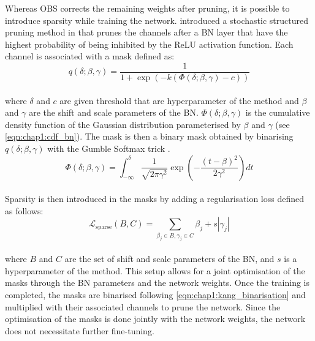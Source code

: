 Whereas \ac{OBS} corrects the remaining weights after pruning, it is possible to
introduce sparsity while training the network.
\citeauthor{DBLP:conf/icml/KangH20} introduced a stochastic structured pruning
method in \cite{DBLP:conf/icml/KangH20} that prunes the channels after a \ac{BN}
layer that have the highest probability of being inhibited by the \ac{ReLU}
activation function. Each channel is associated with a mask defined as:\\

\begin{equation}
  q(\delta;\beta,\gamma) = \frac{1}{1 +\exp ( - k (\Phi(\delta;\beta,\gamma)-c))}
\end{equation}\\

\noindent where $\delta$ and $c$ are given threshold that are hyperparameter of
the method and $\beta$ and $\gamma$ are the shift and scale parameters of the
\ac{BN}. $\Phi(\delta;\beta,\gamma)$ is the cumulative density function of the
Gaussian distribution parameterised by $\beta$ and $\gamma$ (see \cref{eqn:chap1:cdf_bn}). The mask is then a
binary mask obtained by binarising $q(\delta;\beta,\gamma)$ with the Gumble
Softmax trick \cite{DBLP:conf/iclr/JangGP17}.\\

\begin{equation}
  \label{eqn:chap1:cdf_bn}
  \Phi(\delta;\beta,\gamma) = \int_{-\infty}^{\delta} \frac{1}{\sqrt{2\pi\gamma^2}} \exp( - \frac{(t-\beta)^2}{2\gamma^2} ) dt 
\end{equation}\\

\noindent Sparsity is then introduced in the masks by adding a regularisation
loss defined as follows:\\ 

\begin{equation}
 \mathcal{L}_{\text{{sparse}}}(B, C) = \sum_{\beta_j \in B, \gamma_j \in C} \beta_j + s|\gamma_j|
\end{equation}\\

\noindent where $B$ and $C$ are the set of shift and scale parameters of the
\ac{BN}, and $s$ is a hyperparameter of the method. This setup allows for a
joint optimisation of the masks through the \ac{BN} parameters and the network
weights. Once the training is completed, the masks are binarised following
\cref{eqn:chap1:kang_binarisation} and multiplied with their associated channels
to prune the network. Since the optimisation of the masks is done jointly with
the network weights, the network does not necessitate further fine-tuning.\\


